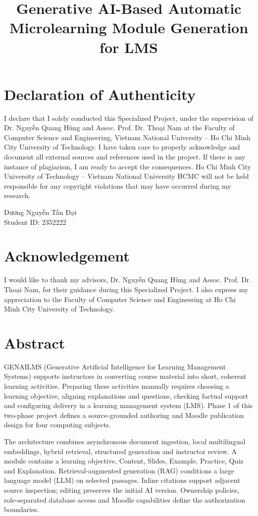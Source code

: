 \documentclass[oneside,final]{hcmut-report}
\title{Generative AI-Based Automatic Microlearning Module Generation for LMS}
\begin{document}
\hypersetup{pageanchor=false}
\coverpage
{}
\hypersetup{pageanchor=true}
\pagestyle{plain}
\thispagestyle{plain}
\section*{Declaration of Authenticity}
I declare that I solely conducted this Specialized Project, under the supervision of Dr. Nguyễn Quang Hùng and Assoc. Prof. Dr. Thoại Nam at the Faculty of Computer Science and Engineering, Vietnam National University -- Ho Chi Minh City University of Technology. I have taken care to properly acknowledge and document all external sources and references used in the project. If there is any instance of plagiarism, I am ready to accept the consequences. Ho Chi Minh City University of Technology -- Vietnam National University HCMC will not be held responsible for any copyright violations that may have occurred during my research.

\vspace{2\baselineskip}
\begin{flushright}
Dương Nguyễn Tấn Đạt\\
Student ID: 2352222
\end{flushright}
\clearpage
\thispagestyle{plain}
\section*{Acknowledgement}
I would like to thank my advisors, Dr. Nguyễn Quang Hùng and Assoc. Prof. Dr. Thoại Nam, for their guidance during this Specialized Project. I also express my appreciation to the Faculty of Computer Science and Engineering at Ho Chi Minh City University of Technology.
\clearpage
\section*{Abstract}
GENAILMS (Generative Artificial Intelligence for Learning Management Systems) supports instructors in converting course material into short, coherent learning activities. Preparing these activities manually requires choosing a learning objective, aligning explanations and questions, checking factual support and configuring delivery in a learning management system (LMS). Phase 1 of this two-phase project defines a source-grounded authoring and Moodle publication design for four computing subjects.

The architecture combines asynchronous document ingestion, local multilingual embeddings, hybrid retrieval, structured generation and instructor review. A module contains a learning objective, Content, Slides, Example, Practice, Quiz and Explanation. Retrieval-augmented generation (RAG) conditions a large language model (LLM) on selected passages. Inline citations support adjacent source inspection; editing preserves the initial AI version. Ownership policies, role-separated database access and Moodle capabilities define the authorization boundaries.
\end{document}
